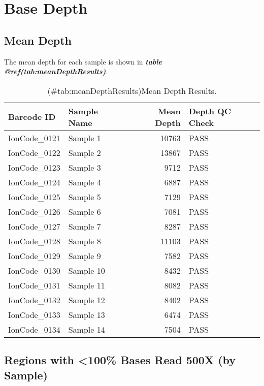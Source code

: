 \documentclass[
]{article}
\begin{document}
\tableofcontents

\newpage

\hypertarget{base-depth}{%
\section{Base Depth}\label{base-depth}}

\hypertarget{mean-depth}{%
\subsection{Mean Depth}\label{mean-depth}}

The mean depth for each sample is shown in \textbf{\emph{table @ref(tab:meanDepthResults)}}.

\begin{longtable}[t]{llrl}
\caption{(\#tab:meanDepthResults)Mean Depth Results.}\\
\toprule
Barcode ID & Sample Name & Mean Depth & Depth QC Check\\
\midrule
IonCode\_0121 & Sample 1 & 10763 & PASS\\
IonCode\_0122 & Sample 2 & 13867 & PASS\\
IonCode\_0123 & Sample 3 & 9712 & PASS\\
IonCode\_0124 & Sample 4 & 6887 & PASS\\
IonCode\_0125 & Sample 5 & 7129 & PASS\\
\addlinespace
IonCode\_0126 & Sample 6 & 7081 & PASS\\
IonCode\_0127 & Sample 7 & 8287 & PASS\\
IonCode\_0128 & Sample 8 & 11103 & PASS\\
IonCode\_0129 & Sample 9 & 7582 & PASS\\
IonCode\_0130 & Sample 10 & 8432 & PASS\\
\addlinespace
IonCode\_0131 & Sample 11 & 8082 & PASS\\
IonCode\_0132 & Sample 12 & 8402 & PASS\\
IonCode\_0133 & Sample 13 & 6474 & PASS\\
IonCode\_0134 & Sample 14 & 7504 & PASS\\
\bottomrule
\end{longtable}

\hypertarget{regions-with-100-bases-read-500x-by-sample}{%
\subsection{Regions with \textless100\% Bases Read 500X (by Sample)}\label{regions-with-100-bases-read-500x-by-sample}}
\end{document}
